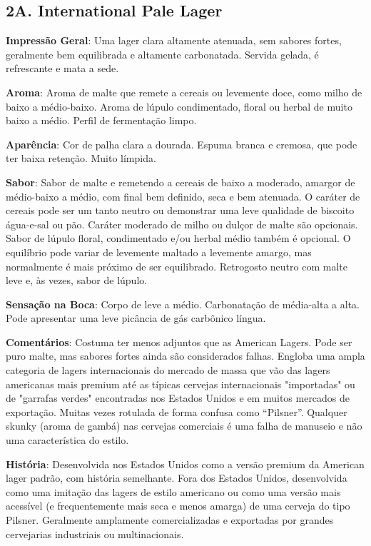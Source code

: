 \subsection*{2A. International Pale Lager}
\textbf{Impressão Geral}: Uma lager clara altamente atenuada, sem sabores fortes, geralmente bem equilibrada e altamente carbonatada. Servida gelada, é refrescante e mata a sede.

\textbf{Aroma}: Aroma de malte que remete a cereais ou levemente doce, como milho de baixo a médio-baixo. Aroma de lúpulo condimentado, floral ou herbal de muito baixo a médio. Perfil de fermentação limpo.

\textbf{Aparência}: Cor de palha clara a dourada. Espuma branca e cremosa, que pode ter baixa retenção. Muito límpida.

\textbf{Sabor}: Sabor de malte e remetendo a cereais de baixo a moderado, amargor de médio-baixo a médio, com final bem definido, seca e bem atenuada. O caráter de cereais pode ser um tanto neutro ou demonstrar uma leve qualidade de biscoito água-e-sal ou pão. Caráter moderado de milho ou dulçor de malte são opcionais. Sabor de lúpulo floral, condimentado e/ou herbal médio também é opcional. O equilíbrio pode variar de levemente maltado a levemente amargo, mas normalmente é mais próximo de ser equilibrado. Retrogosto neutro com malte leve e, às vezes, sabor de lúpulo.

\textbf{Sensação na Boca}: Corpo de leve a médio. Carbonatação de média-alta a alta. Pode apresentar uma leve picância de gás carbônico língua.

\textbf{Comentários}: Costuma ter menos adjuntos que as American Lagers. Pode ser puro malte, mas sabores fortes ainda são considerados falhas. Engloba uma ampla categoria de lagers internacionais do mercado de massa que vão das lagers americanas mais premium até as típicas cervejas internacionais "importadas" ou de "garrafas verdes" encontradas nos Estados Unidos e em muitos mercados de exportação. Muitas vezes rotulada de forma confusa como “Pilsner”. Qualquer skunky (aroma de gambá) nas cervejas comerciais é uma falha de manuseio e não uma característica do estilo.

\textbf{História}: Desenvolvida nos Estados Unidos como a versão premium da American lager padrão, com história semelhante. Fora dos Estados Unidos, desenvolvida como uma imitação das lagers de estilo americano ou como uma versão mais acessível (e frequentemente mais seca e menos amarga) de uma cerveja do tipo Pilsner. Geralmente amplamente comercializadas e exportadas por grandes cervejarias industriais ou multinacionais.

